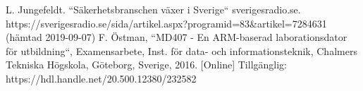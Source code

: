 \begin{thebibliography}{999}
\label{sec:referenser}
L. Jungefeldt. ``Säkerhetsbranschen växer i Sverige`` sverigesradio.se. https://sverigesradio.se/sida/artikel.aspx?programid=83\&artikel=7284631 (hämtad 2019-09-07)
F. Östman, ``MD407 - En ARM-baserad laborationsdator för utbildning``, Examensarbete, Inst. för data- och informationsteknik, Chalmers Tekniska Högskola, Göteborg, Sverige, 2016. [Online] Tillgänglig: https://hdl.handle.net/20.500.12380/232582
\end{thebibliography}


